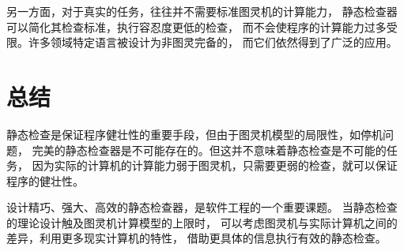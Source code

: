 \documentclass[twocolumn]{ctexart}
\begin{document}
另一方面，对于真实的任务，往往并不需要标准图灵机的计算能力，
静态检查器可以简化其检查标准，执行容忍度更低的检查，
而不会使程序的计算能力过多受限。许多领域特定语言被设计为非图灵完备的，
而它们依然得到了广泛的应用。

\section{总结}

静态检查是保证程序健壮性的重要手段，但由于图灵机模型的局限性，如停机问题，
完美的静态检查器是不可能存在的。但这并不意味着静态检查是不可能的任务，
因为实际的计算机的计算能力弱于图灵机，只需要更弱的检查，就可以保证程序的健壮性。

设计精巧、强大、高效的静态检查器，是软件工程的一个重要课题。
当静态检查的理论设计触及图灵机计算模型的上限时，
可以考虑图灵机与实际计算机之间的差异，利用更多现实计算机的特性，
借助更具体的信息执行有效的静态检查。

\printbibliography[heading=bibintoc,title=参考文献]
\end{document}
